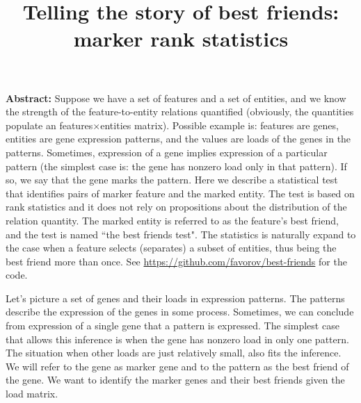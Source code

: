\documentclass[12pt]{article}
\begin{document}

\title{Telling the story of best friends: marker rank statistics}

\vspace{6mm}

\textbf{Abstract:  }Suppose we have a set of features and a set of entities, and we know the strength of the feature-to-entity relations quantified (obviously, the quantities populate an features$\times$entities matrix). Possible example is: features are genes, entities are gene expression patterns, and the values are loads of the genes in the patterns. Sometimes, expression of a gene implies expression of a particular pattern (the simplest case is: the gene has nonzero load only in that pattern). If so, we say that the gene marks the pattern. Here we describe a statistical test that identifies pairs of marker feature and the marked entity. The test is based on rank statistics and it does not rely on propositions about the distribution of the relation quantity. The marked entity is referred to as the feature's best friend, and the test is named ``the best friends test". The statistics is naturally expand to the case when a feature selects (separates) a subset of entities, thus being the best friend more than once. See \url{https://github.com/favorov/best-friends} for the code. 
%

Let's picture a set of genes and their loads in expression patterns. The patterns describe the expression of the genes in some process. Sometimes, we can conclude from expression of a single gene that a pattern is expressed. The simplest case that allows this inference is when the gene has nonzero load in only one pattern. The situation when other loads are just relatively small, also fits the inference. We will refer to the gene as marker gene and to the pattern as the best friend of the gene. We want to identify the marker genes and their best friends given the load matrix.
\end{document}
